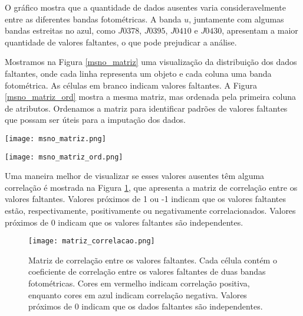 O gráfico mostra que a quantidade de dados ausentes varia consideravelmente entre as diferentes bandas fotométricas. A banda $u$, juntamente com algumas bandas estreitas no azul, como $J0378$, $J0395$, $J0410$ e $J0430$, apresentam a maior quantidade de valores faltantes, o que pode prejudicar a análise.

Mostramos na Figura \ref{msno_matriz} uma visualização da distribuição dos dados faltantes, onde cada linha representa um objeto e cada coluna uma banda fotométrica. As células em branco indicam valores faltantes. A Figura \ref{msno_matriz_ord} mostra a mesma matriz, mas ordenada pela primeira coluna de atributos. Ordenamos a matriz para identificar padrões de valores faltantes que possam ser úteis para a imputação dos dados.

\begin{center}
    \begin{minipage}{0.45\textwidth}
        \centering
        \texttt{[image: msno\_matriz.png]}
        \captionsetup{}
        \label{msno_matriz}
    \end{minipage}
    \hfill
    \begin{minipage}{0.45\textwidth}
        \centering
        \texttt{[image: msno\_matriz\_ord.png]}
        \captionsetup{}
        \label{msno_matriz_ord}
    \end{minipage}
\end{center}

Uma maneira melhor de visualizar se esses valores ausentes têm alguma correlação é mostrada na Figura \ref{matriz_correlacao}, que apresenta a matriz de correlação entre os valores faltantes. Valores próximos de 1 ou -1 indicam que os valores faltantes estão, respectivamente, positivamente ou negativamente correlacionados. Valores próximos de 0 indicam que os valores faltantes são independentes.

\begin{figure}[!ht]
    \begin{center}
    \texttt{[image: matriz\_correlacao.png]}
    \caption[]{Matriz de correlação entre os valores faltantes. Cada célula contém o coeficiente de correlação entre os valores faltantes de duas bandas fotométricas. Cores em vermelho indicam correlação positiva, enquanto cores em azul indicam correlação negativa. Valores próximos de 0 indicam que os dados faltantes são independentes.}
    \label{matriz_correlacao}
    \end{center}
\end{figure}

